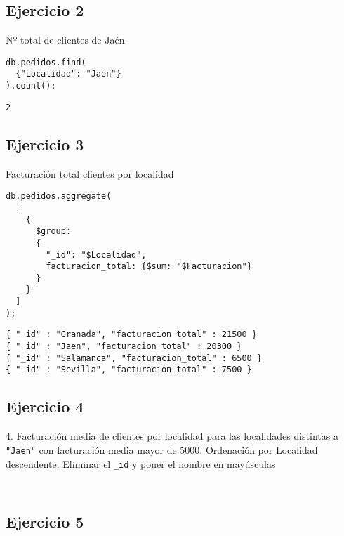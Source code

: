 \subsection{Ejercicio 2}

Nº total de clientes de Jaén

\begin{lstlisting}
db.pedidos.find(
  {"Localidad": "Jaen"}
).count();
\end{lstlisting}

\begin{lstlisting}
2
\end{lstlisting}

\subsection{Ejercicio 3}

Facturación total clientes por localidad

\begin{lstlisting}
db.pedidos.aggregate(
  [
    {
      $group: 
      {
        "_id": "$Localidad", 
        facturacion_total: {$sum: "$Facturacion"}
      }
    }
  ]
);
\end{lstlisting}

\begin{lstlisting}
{ "_id" : "Granada", "facturacion_total" : 21500 }
{ "_id" : "Jaen", "facturacion_total" : 20300 }
{ "_id" : "Salamanca", "facturacion_total" : 6500 }
{ "_id" : "Sevilla", "facturacion_total" : 7500 }
\end{lstlisting}

\subsection{Ejercicio 4}

4. Facturación media de clientes por localidad para las localidades distintas a \texttt{"Jaen"} con facturación media mayor de 5000. Ordenación por Localidad descendente. Eliminar el \texttt{\_id} y poner el nombre en mayúsculas

\begin{lstlisting}

\end{lstlisting}

\begin{lstlisting}

\end{lstlisting}

\subsection{Ejercicio 5}

